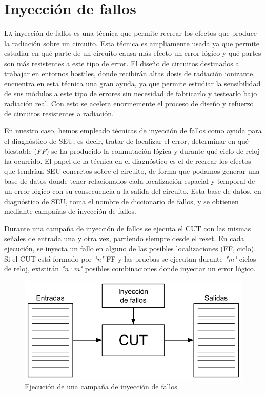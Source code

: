\chapter{Inyección de fallos}
\label{ch:InyeccionDeFallos}

\lettrine[lraise=-0.1, lines=2, loversize=0.2]{L}{a} inyección de fallos es una
técnica que permite recrear los efectos que produce la radiación sobre un
circuito. Esta técnica es ampliamente usada ya que permite estudiar en qué parte
de un circuito causa más efecto un error lógico y qué partes son más resistentes a
este tipo de error. El diseño de circuitos destinados a trabajar en entornos 
hostiles, donde recibirán altas dosis de radiación ionizante, encuentra en esta
técnica una gran ayuda, ya que permite estudiar la sensibilidad de sus módulos a
este tipo de errores sin necesidad de fabricarlo y testearlo bajo radiación real.
Con esto se acelera enormemente el proceso de diseño y refuerzo de circuitos
resistentes a radiación.

En nuestro caso, hemos empleado técnicas de inyección de fallos como ayuda para el
diagnóstico de \gls{SEU}, es decir, tratar de localizar el error, determinar en 
qué biestable (\textit{\gls{FF}}) se ha producido la conmutación lógica y durante
qué ciclo de reloj ha ocurrido. El papel de la técnica en el diagnóstico es el de
recrear los efectos que tendrían \gls{SEU} concretos sobre el circuito, de forma
que podamos generar una base de datos donde tener relacionados cada localización
espacial y temporal de un error lógico con su consecuencia a la salida del
circuito. Esta base de datos, en diagnóstico de \gls{SEU}, toma el nombre de
diccionario de fallos, y se obtienen mediante campañas de inyección de fallos.

Durante una campaña de inyección de fallos se ejecuta el \gls{CUT} con las mismas
señales de entrada una y otra vez, partiendo siempre desde el reset. En cada
ejecución, se inyecta un fallo en alguno de las posibles localizaciones (\gls{FF}, 
ciclo). Si el \gls{CUT} está formado por \textit{"n"} \gls{FF} y las pruebas se 
ejecutan durante \textit{"m"} ciclos de reloj, existirán \textit{"n·m"} posibles 
combinaciones donde inyectar un error lógico.

\begin{figure}[htbp]
    \centering
    \includegraphics[width=0.95\linewidth]
    {InyeccionDeFallos/figuras/fig31.png}
    \caption{Ejecución de una campaña de inyección de fallos}
    \label{fig:Inyeccion}
\end{figure}


